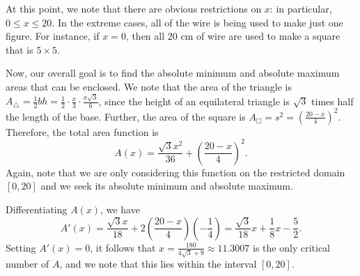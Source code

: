 At this point, we note that there are obvious restrictions on $x$:  in particular, $0 \le x \le 20$.  In the extreme cases, all of the wire is being used to make just one figure.  For instance, if $x = 0$, then all 20 cm of wire are used to make a square that is $5 \times 5$.

Now, our overall goal is to find the absolute minimum and absolute maximum areas that can be enclosed.  We note that the area of the triangle is $A_{\triangle} = \frac{1}{2} bh = \frac{1}{2} \cdot \frac{x}{3} \cdot \frac{x\sqrt{3}}{6}$, since the height of an equilateral triangle is $\sqrt{3}$ times half the length of the base.  Further, the area of the square is $A_{\Box} = s^2 = \left( \frac{20-x}{4} \right)^2$.  Therefore, the total area function is
$$A(x) = \frac{\sqrt{3}x^2}{36} + \left( \frac{20-x}{4} \right)^2.$$
Again, note that we are only considering this function on the restricted domain $[0,20]$ and we seek its absolute minimum and absolute maximum.

Differentiating $A(x)$, we have
$$A'(x) = \frac{\sqrt{3}x}{18} + 2\left( \frac{20-x}{4} \right)\left( -\frac{1}{4} \right) = \frac{\sqrt{3}}{18} x + \frac{1}{8}x - \frac{5}{2}.$$
Setting $A'(x) = 0$, it follows that $x = \frac{180}{4\sqrt{3}+9} \approx 11.3007$ is the only critical number of $A$, and we note that this lies within the interval $[0,20]$.  

